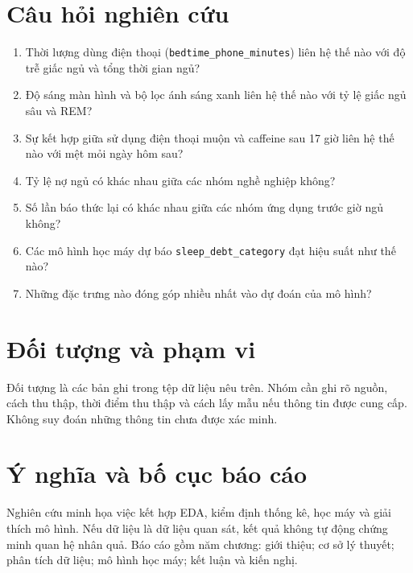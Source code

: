 \section{Câu hỏi nghiên cứu}
\begin{enumerate}[leftmargin=1.2cm]
\item Thời lượng dùng điện thoại (\texttt{bedtime\_phone\_minutes}) liên hệ thế nào với độ trễ giấc ngủ và tổng thời gian ngủ?
\item Độ sáng màn hình và bộ lọc ánh sáng xanh liên hệ thế nào với tỷ lệ giấc ngủ sâu và REM?
\item Sự kết hợp giữa sử dụng điện thoại muộn và caffeine sau 17 giờ liên hệ thế nào với mệt mỏi ngày hôm sau?
\item Tỷ lệ nợ ngủ có khác nhau giữa các nhóm nghề nghiệp không?
\item Số lần báo thức lại có khác nhau giữa các nhóm ứng dụng trước giờ ngủ không?
\item Các mô hình học máy dự báo \texttt{sleep\_debt\_category} đạt hiệu suất như thế nào?
\item Những đặc trưng nào đóng góp nhiều nhất vào dự đoán của mô hình?
\end{enumerate}
\section{Đối tượng và phạm vi}
Đối tượng là các bản ghi trong tệp dữ liệu nêu trên. Nhóm cần ghi rõ nguồn, cách thu thập, thời điểm thu thập và cách lấy mẫu nếu thông tin được cung cấp. Không suy đoán những thông tin chưa được xác minh.
\section{Ý nghĩa và bố cục báo cáo}
Nghiên cứu minh họa việc kết hợp EDA, kiểm định thống kê, học máy và giải thích mô hình. Nếu dữ liệu là dữ liệu quan sát, kết quả không tự động chứng minh quan hệ nhân quả. Báo cáo gồm năm chương: giới thiệu; cơ sở lý thuyết; phân tích dữ liệu; mô hình học máy; kết luận và kiến nghị.
